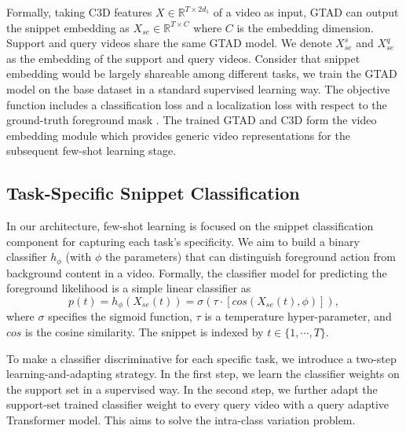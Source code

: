 \documentclass{bmvc2k}
\begin{document}
Formally, taking C3D features $X \in \mathbb{R}^{T \times 2d_1}$ of a video as input, 
GTAD can output the snippet embedding as ${X}_{se} \in \mathbb{R}^{T \times C}$
where $C$ is the embedding dimension.
Support and query videos share the same GTAD model. {We denote $X^{s}_{se}$ and $X^{q}_{se}$ as the embedding of the support and query videos.}
Consider that snippet embedding would be largely shareable
among different tasks,
we train the GTAD model on the base dataset
in a standard supervised learning way.
The objective function includes a classification loss 
and a localization loss with respect to the ground-truth foreground mask  \cite{xu2020gtad}.
The trained GTAD and C3D form the video embedding module
which provides generic video representations for the
subsequent few-shot learning stage.



















\subsection{Task-Specific Snippet Classification}
\label{sec:classification}
In our architecture, few-shot learning is focused on the snippet classification component for capturing each task's specificity.
We aim to build a binary classifier $h_{\phi}$ (with $\phi$ the parameters) that can distinguish foreground action from background content in a video.
Formally, the classifier model for predicting the foreground likelihood is a simple linear classifier as
\begin{equation}\label{eqn_1}
\textit{p}(t) = h_{\phi}(X_{se}(t)) = \sigma(\tau \cdot [cos(X_{se}(t), \phi)]),
\end{equation}
where $\sigma$ specifies the sigmoid function,
$\tau$ is a temperature hyper-parameter, and $cos$ is the cosine similarity. 
The snippet is indexed by $t \in \{1, \cdots, T\}$.



To make a classifier discriminative for each specific task, we introduce a two-step learning-and-adapting strategy.
In the first step,
we learn the classifier weights on the support set
in a supervised way.
In the second step,
we further adapt the support-set trained classifier weight
to every query video with a query adaptive Transformer model.
This aims to solve the intra-class variation problem.
\end{document}
